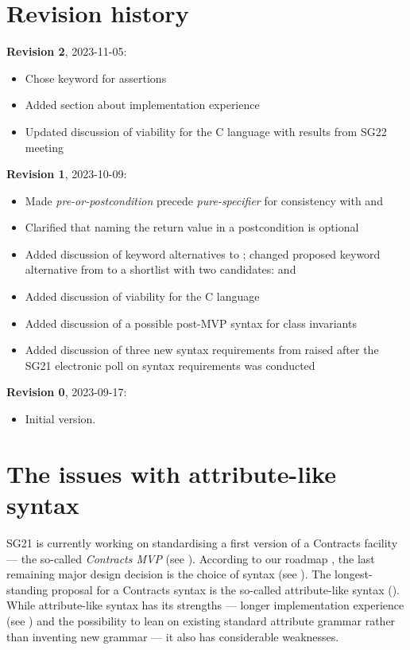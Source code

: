 \section*{Revision history}
\textbf{Revision 2}, 2023-11-05:
\begin{itemize}
\item Chose keyword  for assertions
\item Added section about implementation experience
\item Updated discussion of viability for the C language with results from SG22 meeting
\end{itemize}
\textbf{Revision 1}, 2023-10-09: 
\begin{itemize}
\item Made \emph{pre-or-postcondition} precede \emph{pure-specifier} for consistency with  and 
\item Clarified that naming the return value in a postcondition is optional
\item Added discussion of keyword alternatives to ; changed proposed keyword alternative from  to a shortlist with two candidates:  and 
\item Added discussion of viability for the C language
\item Added discussion of a possible post-MVP syntax for class invariants
\item Added discussion of three new syntax requirements from \cite{P2885R3} raised after the SG21 electronic poll on syntax requirements was conducted
\end{itemize}
\textbf{Revision 0}, 2023-09-17: 
\begin{itemize}
\item Initial version.
\end{itemize}



\section{The issues with attribute-like syntax}
\label{sec:motivation}

SG21 is currently working on standardising a first version of a Contracts facility --- the so-called \emph{Contracts MVP} (see \cite{P2900R0}). According to our roadmap \cite{P2695R1}, the last remaining major design decision is the choice of syntax (see \cite{P2885R3}). The longest-standing proposal for a Contracts syntax is the so-called attribute-like syntax (\cite{P2935R3}). While attribute-like syntax has its strengths --- longer implementation experience (see \cite{P1680R0}) and the possibility to lean on existing standard attribute grammar rather than inventing new grammar --- it also has considerable weaknesses.

